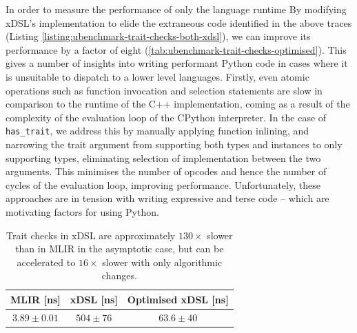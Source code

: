 

In order to measure the performance of only the language runtime
By modifying xDSL's implementation to elide the extraneous code identified in the above traces (Listing \ref{listing:ubenchmark-trait-checks-both-xdsl}), we can improve its performance by a factor of eight (\autoref{tab:ubenchmark-trait-checks-optimised}).
This gives a number of insights into writing performant Python code in cases where it is unsuitable to dispatch to a lower level languages.
Firstly, even atomic operations such as function invocation and selection statements are slow in comparison to the runtime of the C++ implementation, coming as a result of the complexity of the evaluation loop of the CPython interpreter. %
In the case of \texttt{has_trait}, we address this by manually applying function inlining, and narrowing the trait argument from supporting both types and instances to only supporting types, eliminating selection of implementation between the two arguments. This minimises the number of opcodes and hence the number of cycles of the evaluation loop, improving performance.
Unfortunately, these approaches are in tension with writing expressive and terse code -- which are motivating factors for using Python.



\begin{table}[H]
  \caption{Trait checks in xDSL are approximately $130\times$ slower than in MLIR in the asymptotic case, but can be accelerated to $16\times$ slower with only algorithmic changes.} %
  \label{tab:ubenchmark-trait-checks-optimised}
  \centering
  \begin{tabular}{ccc}
    \toprule
    \textbf{MLIR [ns]} & \textbf{xDSL [ns]} & \textbf{Optimised xDSL [ns]} \\
    \midrule
    $3.89 \pm 0.01$ & $504 \pm 76$ & $63.6 \pm 40$\\
    \bottomrule
  \end{tabular}
\end{table}




